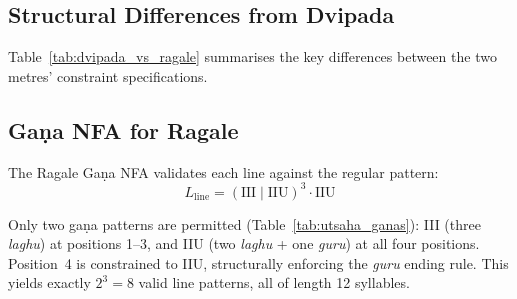 \documentclass[11pt]{article}
\begin{document}
\subsection{Structural Differences from Dvipada}

Table~\ref{tab:dvipada_vs_ragale} summarises the key differences
between the two metres' constraint specifications.

\begin{table}[h]
\centering
\small
\caption{Dvipada vs.\ Ragale constraint comparison.}
\label{tab:dvipada_vs_ragale}
\end{table}

\subsection{Ga\d{n}a NFA for Ragale}

The Ragale Ga\d{n}a NFA validates each line against the regular pattern:
\begin{equation}
L_{\text{line}} = (\text{III} \mid \text{IIU})^3 \cdot \text{IIU}
\end{equation}

Only two ga\d{n}a patterns are permitted (Table~\ref{tab:utsaha_ganas}):
III (three \textit{laghu}) at positions 1--3, and IIU (two \textit{laghu}
+ one \textit{guru}) at all four positions. Position~4 is constrained to
IIU, structurally enforcing the \textit{guru} ending rule. This yields
exactly $2^3 = 8$ valid line patterns, all of length 12 syllables.
\end{document}

